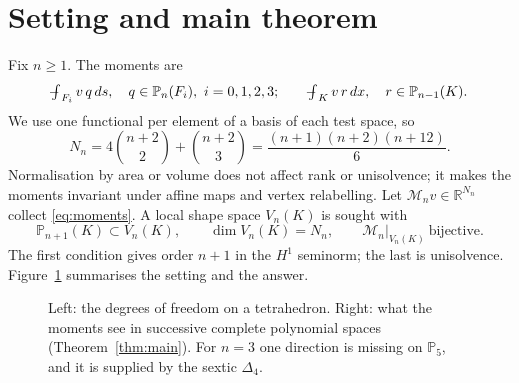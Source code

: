 \documentclass[11pt,a4paper]{article}
\theoremstyle{definition}
\theoremstyle{remark}
\newcommand{\M}{\mathcal M}
\newcommand{\avg}{\mathop{\mathchoice{{\textstyle\int}\mkern-15.5mu{-}\mkern2mu}{\int\mkern-12mu{-}\mkern1mu}{\int\mkern-11mu{-}}{\int\mkern-11mu{-}}}\nolimits}
\newcommand{\Pol}{\mathbb P}
\begin{document}
\section{Setting and main theorem}
\label{sec:setting}

Fix \(n\ge1\). The moments are
\begin{equation}
 \avg_{F_i} v\,q\,ds,\quad q\in\Pol_n(F_i),\ i=0,1,2,3;
 \qquad
 \avg_K v\,r\,dx,\quad r\in\Pol_{n-1}(K).
 \label{eq:moments}
\end{equation}
We use one functional per element of a basis of each test space, so
\begin{equation}
 N_n=4\binom{n+2}{2}+\binom{n+2}{3}=\frac{(n+1)(n+2)(n+12)}6 .
 \label{eq:count}
\end{equation}
Normalisation by area or volume does not affect rank or unisolvence;
it makes the moments invariant under affine maps and vertex
relabelling. Let \(\M_n v\in\mathbb R^{N_n}\) collect \eqref{eq:moments}.
A local shape space \(V_n(K)\) is sought with
\begin{equation}
 \Pol_{n+1}(K)\subset V_n(K),\qquad \dim V_n(K)=N_n,\qquad
 \M_n|_{V_n(K)}\ \text{bijective}.
 \label{eq:goal}
\end{equation}
The first condition gives order \(n+1\) in the \(H^1\) seminorm; the last
is unisolvence. Figure~\ref{fig:overview} summarises the setting and the
answer.

\begin{figure}[ht]
\centering
{}
\caption{Left: the degrees of freedom on a tetrahedron. Right: what the
moments see in successive complete polynomial spaces
(Theorem~\ref{thm:main}). For \(n=3\) one direction is missing on
\(\Pol_5\), and it is supplied by the sextic \(\Delta_4\).}
\label{fig:overview}
\end{figure}
\end{document}
